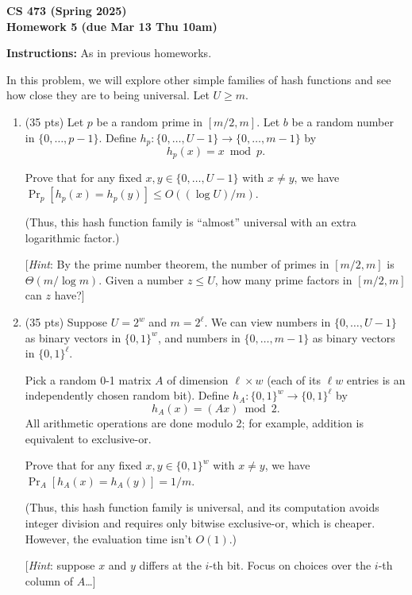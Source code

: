 \documentclass[11pt]{article}
\begin{document}
\begin{center}\Large\bf 
CS 473 (Spring 2025)\\
Homework 5 (due Mar 13 Thu 10am)
\end{center}

\medskip\noindent
{\bf Instructions:} As in previous homeworks.



\begin{description}
\bigskip
\item[Problem 5.1:]
In this problem, we will explore other simple families of hash functions
and see how close they are to being universal.  Let $U\ge m$.

\begin{enumerate}
\item[(a)] (35 pts)
Let $p$ be a random prime in $[m/2,m]$.
Let $b$ be a random number in $\{0,\ldots,p-1\}$.
Define $h_p : \{0,\ldots,U-1\} \rightarrow \{0,\ldots,m-1\}$ by
\[ h_p(x) = x\bmod p.\]

Prove that for any fixed $x,y\in\{0,\ldots,U-1\}$ with $x\neq y$,
we have $\Pr_p[h_p(x)=h_p(y)] \le O((\log U)/ m)$.

(Thus, this hash function family is ``almost'' universal with an extra logarithmic factor.)

[\emph{Hint}: By the prime number theorem, the number of primes in $[m/2,m]$ is $\Theta(m/\log m)$.
Given a number $z\le U$, how many prime factors in $[m/2,m]$ can $z$ have?]

\medskip
\item[(b)] (35 pts)
Suppose $U=2^w$ and $m=2^\ell$.  We can view numbers in $\{0,\ldots,U-1\}$ as
binary vectors in $\{0,1\}^w$, and numbers in $\{0,\ldots,m-1\}$ as binary
vectors in $\{0,1\}^\ell$.

Pick a random 0-1 matrix $A$ of dimension $\ell \times w$ (each of its $\ell w$ entries is
an independently chosen random bit).
Define $h_A : \{0,1\}^w \rightarrow \{0,1\}^\ell$ by
\[ h_A(x) = (Ax) \bmod 2. \]
All arithmetic operations are done modulo 2; for example,
addition is equivalent to exclusive-or.

Prove that for any fixed $x,y\in\{0,1\}^w$ with $x\neq y$,
we have $\Pr_A[h_A(x)=h_A(y)] = 1/m$.

(Thus, this hash function family is universal, and its computation avoids integer division and requires only bitwise exclusive-or, which is cheaper.  However, the evaluation time isn't $O(1)$.)

[\emph{Hint}: suppose $x$ and $y$ differs at the $i$-th bit.  Focus on choices over the $i$-th column of $A$\ldots]


\end{enumerate}
\end{description}
\end{document}
